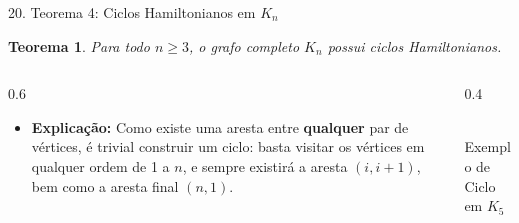 \documentclass[9pt]{beamer}
\newtheorem{teorema}{Teorema}\usepackage{mathtools}
\begin{document}
    \begin{frame}{20. Teorema 4: Ciclos Hamiltonianos em $K_n$}
        \begin{teorema}
            Para todo $n \ge 3$, o grafo completo $K_n$ possui ciclos Hamiltonianos.
        \end{teorema}
        \vspace{0.3cm}
        \begin{columns}
            \begin{column}{0.6\textwidth}
                \begin{itemize}
                    \item \textbf{Explicação:} Como existe uma aresta entre \textbf{qualquer} par de vértices, é trivial construir um ciclo: basta visitar os vértices em qualquer ordem de 1 a $n$, e sempre existirá a aresta $(i, i+1)$, bem como a aresta final $(n, 1)$.
                \end{itemize}
            \end{column}
            \begin{column}{0.4\textwidth}
                \centering
                \\
                \tiny Exemplo de Ciclo em $K_5$
            \end{column}
        \end{columns}
    \end{frame}
\end{document}
